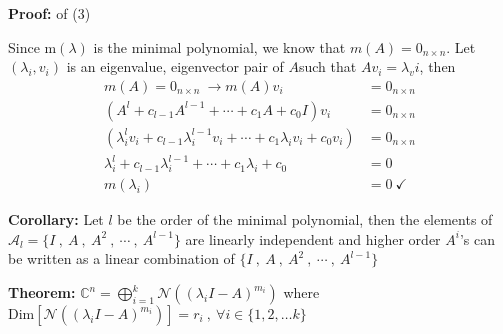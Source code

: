 \documentclass[twoside]{article}
\begin{document}
\textbf{Proof:} of (3) 

Since m$(\lambda)$ is the minimal polynomial, we know that $m(A) = 0_{n \times n}$. Let $(\lambda_i , v_i)$ is an eigenvalue, eigenvector pair of $A$such that $A v_i = \lambda_vi$, then
%
\begin{align*}
m(A) = 0_{n \times n} \ \rightarrow m(A) v_i &= 0_{n \times n} 
\\
\left( A^l + c_{l-1} A^{l-1} + \cdots + c_1 A + c_0 I \right) v_i &= 0_{n \times n} 
\\
\left( \lambda_i^l v_i + c_{l-1} \lambda_i^{l-1} v_i  + \cdots + c_1 \lambda_i v_i + c_0  v_i \right)  &= 0_{n \times n} 
\\
 \lambda_i^l  + c_{l-1} \lambda_i^{l-1}   + \cdots + c_1 \lambda_i  + c_0   &= 0
 \\
m(\lambda_i)  &= 0 \ \checkmark
\end{align*}

\textbf{Corollary:} Let $l$ be the order of the minimal polynomial, then the elements of $\mathcal{A}_l = \lbrace I \ , \ A \ , \ A^2 \ , \ \cdots \ , \ A^{l-1} \rbrace$ 
are linearly independent and higher order $A^i$'s can be written as a linear combination of $\lbrace I \ , \ A \ , \ A^2 \ , \ \cdots \ , \ A^{l-1} \rbrace$  

\vspace{6pt}

\textbf{Theorem:} $\mathbb{C}^{n} =  \bigoplus_{i=1}^k \mathcal{N}\left( (\lambda_i I - A )^{m_i} \right) $ where $\mathrm{Dim} \left[  \mathcal{N}\left( (\lambda_i I - A )^{m_i} \right) \right] = r_i \ , \ \forall i \in \{1, 2, \dots k\}$

\end{document}
